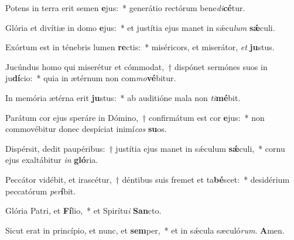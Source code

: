 \item Potens in terra erit semen \textbf{e}jus:~* generátio rectórum bene\hspace*{0.03em}\textit{di}\textbf{cé}tur.
\item Glória et divítiæ in domo \textbf{e}jus:~* et justítia ejus manet in sǽcu\hspace*{0.03em}\textit{lum} \textbf{sǽ}culi.
\item Exórtum est in ténebris lumen \textbf{re}ctis:~* miséricors, et miserátor, \textit{et} \textbf{ju}stus.
\item Jucúndus homo qui miserétur et cómmodat,~† dispónet sermónes suos in ju\textbf{dí}cio:~* quia in ætérnum non com\textit{mo}\textbf{vé}bitur.
\item In memória ætérna erit \textbf{ju}stus:~* ab auditióne mala non \textit{ti}\textbf{mé}bit.
\item Parátum cor ejus speráre in Dómino,~† confirmátum est cor \textbf{e}jus:~* non commovébitur donec despíciat inimí\hspace*{0.01em}\textit{cos} \textbf{su}os.
\item Dispérsit, dedit paupéribus:~† justítia ejus manet in sǽculum \textbf{sǽ}culi,~* cornu ejus exaltábitur \textit{in} \textbf{gló}ria.
\item Peccátor vidébit, et irascétur,~† déntibus suis fremet et ta\textbf{bé}scet:~* desidérium peccatórum \textit{per}\textbf{í}bit.
\item Glória Patri, et \textbf{Fí}lio,~* et Spirítu\textit{i} \textbf{San}cto.
\item Sicut erat in princípio, et nunc, et \textbf{sem}per,~* et in sǽcula sæculó\textit{rum}. \textbf{A}men.
